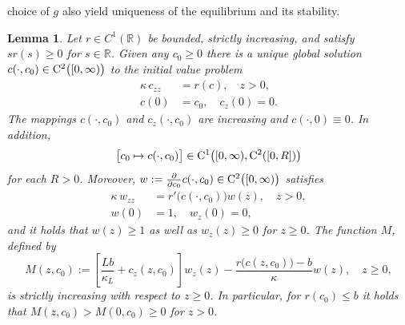 \documentclass[reqno,11pt]{amsart}
\newtheorem{lem}[thm]{Lemma}
\numberwithin{equation}{section}
\begin{document}
choice of $g$ also yield uniqueness of the equilibrium and its stability.
\begin{lem}\label{L10}
Let $r\in C^1(\mathbb{R})$ be bounded, strictly increasing,
and satisfy $s r(s)\ge 0$ for $s\in \mathbb{R}$. Given any
$c_0\ge 0$ there is a unique global solution $c(\cdot,c_0)\in
{\rm C}^2 \bigl( [0,\infty)\bigr) $ to the initial value
problem
\begin{subequations}
\label{c1}
\begin{align}
\kappa\, c_{zz}&= r( c ),\quad z>0,\label{c2}\\
c(0)&=c_0,\quad  c_z(0)=0. \label{c3} 
\end{align}
 \end{subequations}
The mappings $c(\cdot,c_0)$ and $c_z(\cdot,c_0)$ are increasing and
$c(\cdot,0)\equiv 0$. In addition,
$$
\bigl[ c_0\mapsto c(\cdot,c_0)\bigr]
\in{\rm C}^1\bigl([0,\infty),{\rm C}^2([0,R])\bigr)$$
for each $R>0$. Moreover, $w:=\frac{\partial}{\partial c_0} c(\cdot,c_0)\in
{\rm C}^2\bigl([0,\infty)\bigr)$ satisfies
\begin{subequations}
\label{w1}
\begin{align}
\kappa\, w_{zz}&= r'\bigl( c(\cdot,c_0)\bigr) w(z),\quad
z>0,\label{w2}\\  w(0)&=1,\quad w_z(0)=0, \label{w3} 
\end{align}
\end{subequations}
and it holds that $w(z)\ge 1$ as well as $w_z(z)\ge 0$ for $z\ge0$.
The function $M$, defined by
$$
M(z,c_0):=\left[\frac{Lb}{\kappa_L}+c_z(z,c_0)\right]
w_z(z)-\frac{r\bigl( c(z,c_0)\bigr)-b }{\kappa}w(z),\quad z\ge 0,
$$
is strictly increasing with respect to $z\ge 0$. In particular, for $r(c_0)\le b$ it holds
that $M(z,c_0)> M(0,c_0)\ge 0$ for $z> 0$. 
\end{lem}
\end{document}
